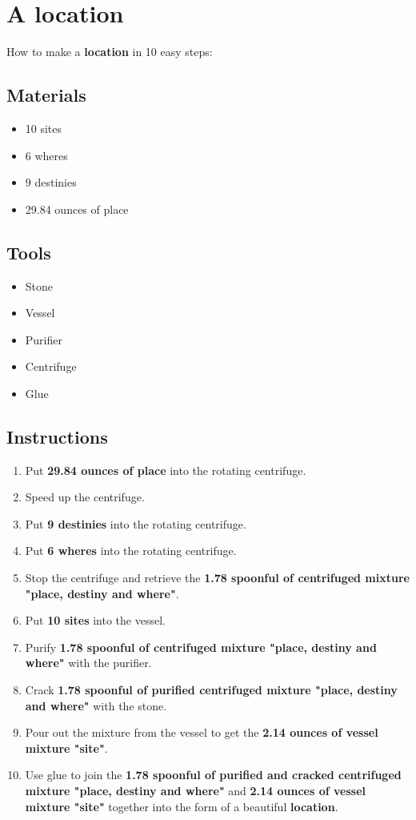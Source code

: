 \documentclass{article}
\begin{document}
\section{A location}How to make a \textbf{location} in 10 easy steps:

\subsection{Materials}\begin{itemize}
\item 
10 sites
\item 
6 wheres
\item 
9 destinies
\item 
29.84 ounces of place
\end{itemize}
\subsection{Tools}\begin{itemize}
\item 
Stone
\item 
Vessel
\item 
Purifier
\item 
Centrifuge
\item 
Glue
\end{itemize}
\subsection{Instructions}\begin{enumerate}
\item 
Put \textbf{29.84 ounces of place} into the rotating centrifuge.
\item 
Speed up the centrifuge.
\item 
Put \textbf{9 destinies} into the rotating centrifuge.
\item 
Put \textbf{6 wheres} into the rotating centrifuge.
\item 
Stop the centrifuge and retrieve the \textbf{1.78 spoonful of centrifuged mixture "place, destiny and where"}.
\item 
Put \textbf{10 sites} into the vessel.
\item 
Purify \textbf{1.78 spoonful of centrifuged mixture "place, destiny and where"} with the purifier.
\item 
Crack \textbf{1.78 spoonful of purified centrifuged mixture "place, destiny and where"} with the stone.
\item 
Pour out the mixture from the vessel to get the \textbf{2.14 ounces of vessel mixture "site"}.
\item 
Use glue to join the \textbf{1.78 spoonful of purified and cracked centrifuged mixture "place, destiny and where"} and \textbf{2.14 ounces of vessel mixture "site"} together into the form of a beautiful \textbf{location}.
\end{enumerate}
\newpage
\end{document}
